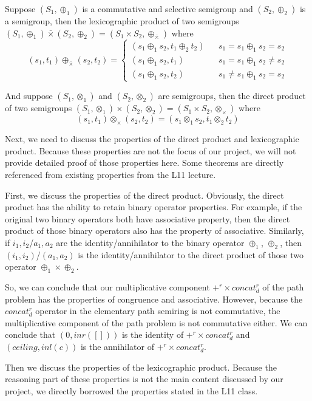 \documentclass[a4paper,12pt,twoside,openright]{report}
\begin{document}
Suppose $(S_1,\oplus_1)$ is a commutative and selective semigroup and $(S_2,\oplus_2)$ is a semigroup, then the lexicographic product of two semigroups $(S_1,\oplus_1) \bar{\times} (S_2,\oplus_2) = (S_1\times S_2, \oplus_{\bar{\times}})$ where
\[(s_1,t_1) \oplus_{\bar{\times}} (s_2,t_2)=\left\{
\begin{array}{rcl}
(s_1\oplus_1 s_2,t_1\oplus_2 t_2)      &      & { s_1 = s_1 \oplus_1 s_2 = s_2}\\
(s_1\oplus_1 s_2,t_1)       &      & {s_1 = s_1 \oplus_1 s_2 \neq s_2}\\
(s_1\oplus_1 s_2,t_2)       &      & {s_1 \neq s_1 \oplus_1 s_2 = s_2}
\end{array} \right.\]

And suppose $(S_1,\otimes_1)$ and $(S_2,\otimes_2)$ are semigroups, then the direct product of two semigroups $(S_1,\otimes_1) \times (S_2,\otimes_2) = (S_1\times S_2, \otimes_\times)$ where
\[(s_1,t_1) \otimes_\times (s_2,t_2)= (s_1 \otimes_1 s_2, t_1\otimes_2 t_2)\]

Next, we need to discuss the properties of the direct product and lexicographic product. Because these properties are not the focus of our project, we will not provide detailed proof of those properties here. Some theorems are directly referenced from existing properties from the L11 lecture.

First, we discuss the properties of the direct product. Obviously, the direct product has the ability to retain binary operator properties. For example, if the original two binary operators both have associative property, then the direct product of those binary operators also has the property of associative. Similarly, if $i_1,i_2$/$a_1,a_2$ are the identity/annihilator to the binary operator $\oplus_1$, $\oplus_2$, then $(i_1,i_2)$/$(a_1,a_2)$ is the identity/annihilator to the direct product of those two operator $\oplus_1 \times \oplus_2$.

So, we can conclude that our multiplicative component $+^r \times concat^r_d$ of the path problem has the properties of congruence and associative. However, because the $concat^r_d$ operator in the elementary path semiring is not commutative, the multiplicative component of the path problem is not commutative either. We can conclude that $(0,inr([]))$ is the identity of $+^r \times concat^r_d$ and $(ceiling,inl(c))$ is the annihilator of $+^r \times concat^r_d$.


Then we discuss the properties of the lexicographic product.
Because the reasoning part of these properties is not the main content discussed by our project, we directly borrowed the properties stated in the L11 class.
\end{document}
